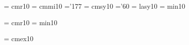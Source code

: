  \font\twtyrm  = cmr10     %
 \font\twtymi  = cmmi10    %
    \skewchar\twtymi ='177          %
 \font\twtysy  = cmsy10    %
    \skewchar\twtysy ='60           %
 \font\twtyly  = lasy10   %
\font\twtymin = min10     %

 \font\twfvrm  = cmr10     %
\font\twfvmin = min10     %

 \font\tenex   = cmex10 

